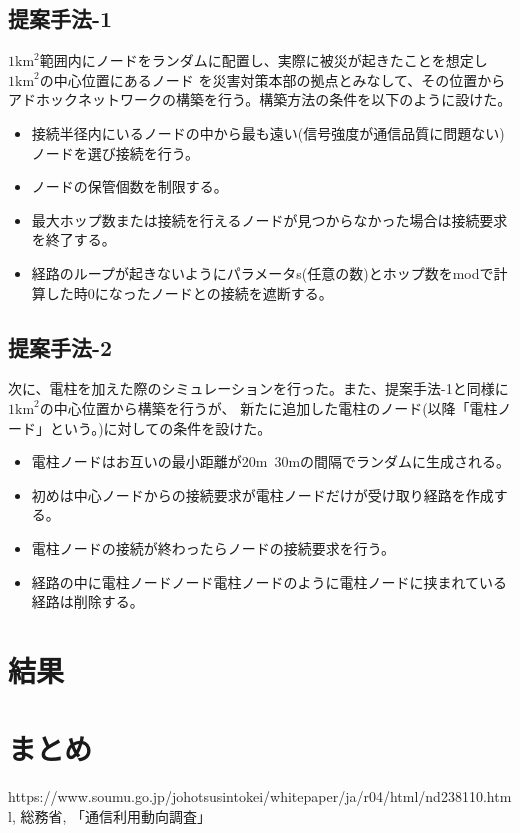 \documentclass[a4paper, 10pt]{ltjsarticle}
\begin{document}
\subsection{提案手法-1}
$1\mathrm{km}^2$範囲内にノードをランダムに配置し、実際に被災が起きたことを想定し$1\mathrm{km}^2$の中心位置にあるノード
を災害対策本部の拠点とみなして、その位置からアドホックネットワークの構築を行う。構築方法の条件を以下のように設けた。
\begin{itemize}
  \item 接続半径内にいるノードの中から最も遠い(信号強度が通信品質に問題ない)ノードを選び接続を行う。
  \item ノードの保管個数を制限する。
  \item 最大ホップ数または接続を行えるノードが見つからなかった場合は接続要求を終了する。
  \item 経路のループが起きないようにパラメータs(任意の数)とホップ数をmodで計算した時0になったノードとの接続を遮断する。
\end{itemize}

\subsection{提案手法-2}
次に、電柱を加えた際のシミュレーションを行った。また、提案手法-1と同様に$1\mathrm{km}^2$の中心位置から構築を行うが、
新たに追加した電柱のノード(以降「電柱ノード」という。)に対しての条件を設けた。
\begin{itemize}
  \item 電柱ノードはお互いの最小距離が20m~30mの間隔でランダムに生成される。
  \item 初めは中心ノードからの接続要求が電柱ノードだけが受け取り経路を作成する。
  \item 電柱ノードの接続が終わったらノードの接続要求を行う。
  \item 経路の中に電柱ノード\rightarrow ノード\rightarrow 電柱ノードのように電柱ノードに挟まれている経路は削除する。
\end{itemize}

\section{結果}

\section{まとめ}

\begin{thebibliography}{9}
   https://www.soumu.go.jp/johotsusintokei/whitepaper/ja/r04/html/nd238110.html, 総務省, 「通信利用動向調査」 
\end{thebibliography}
\end{document}
